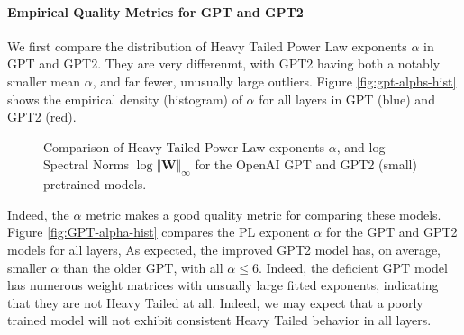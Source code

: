 \paragraph{Empirical Quality Metrics for GPT and GPT2}
We first compare the distribution of  Heavy Tailed Power Law exponents $\alpha$ in GPT and GPT2.
They are very differenmt, with GPT2 having both a notably smaller mean $\alpha$, and far fewer, unusually large outliers.
Figure \ref{fig:gpt-alphs-hist} shows the empirical density (histogram) of $\alpha$
for all layers in GPT (blue) and GPT2 (red).  

\begin{figure}
    \centering
    \qquad


   \caption{Comparison of Heavy Tailed Power Law exponents $\alpha$, and log Spectral Norms $\log\Vert\mathbf{W}\Vert_{\infty}$
for the OpenAI GPT and GPT2 (small) pretrained models.}

\end{figure}

Indeed, the $\alpha$ metric makes a good quality metric for comparing these models.
Figure \ref{fig:GPT-alpha-hist} compares the PL exponent $\alpha$ for the GPT and GPT2 models for all layers,
As expected, the improved GPT2 model has, on average, smaller $\alpha$ than the older GPT, with all
$\alpha\le6$.  Indeed, the deficient GPT model has numerous weight matrices with unsually large fitted exponents,
indicating that they are not Heavy Tailed at all.  Indeed, we may expect that a poorly trained model
will not exhibit consistent Heavy Tailed behavior in all layers.

